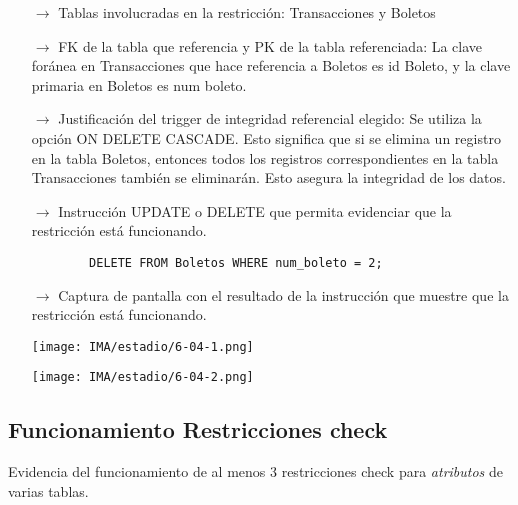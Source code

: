\begin{itemize}
    \item[$\rightarrow$] Tablas involucradas en la restricción: Transacciones y Boletos
    \item[$\rightarrow$] FK de la tabla que referencia y PK de la tabla referenciada: La clave foránea en Transacciones que hace referencia a Boletos es id Boleto, y la clave primaria en Boletos es num boleto.
    \item[$\rightarrow$] Justificación del trigger de integridad referencial elegido: Se utiliza la opción ON DELETE CASCADE. Esto significa que si se elimina un registro en la tabla Boletos, entonces todos los registros correspondientes en la tabla Transacciones también se eliminarán. Esto asegura la integridad de los datos.
    \item[$\rightarrow$] Instrucción UPDATE o DELETE que permita evidenciar que la restricción está
    funcionando.
    \begin{verbatim}
        DELETE FROM Boletos WHERE num_boleto = 2;
    \end{verbatim}
    \item[$\rightarrow$] Captura de pantalla con el resultado de la instrucción que muestre que la restricción está
    funcionando.
    \begin{center}
        \texttt{[image: IMA/estadio/6-04-1.png]}

        \texttt{[image: IMA/estadio/6-04-2.png]}
    \end{center}
\end{itemize}


\subsection{Funcionamiento Restricciones check}

Evidencia del funcionamiento de al menos 3 restricciones check para \textit{atributos} de varias
tablas.

